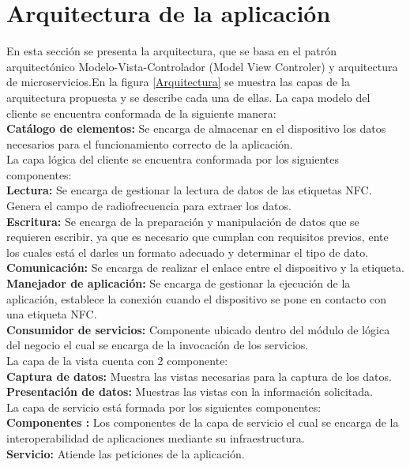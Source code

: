 \documentclass[11pt,openany]{book}
\newcounter{ns}
\begin{document}
	\section{Arquitectura de la aplicación}
	En esta sección se presenta la arquitectura, que se basa en el patrón arquitectónico Modelo-Vista-Controlador (Model View Controler) y arquitectura de microservicios.En la figura \ref{Arquitectura} se muestra las capas de la arquitectura propuesta y se describe cada una de ellas. La capa modelo del cliente se encuentra conformada de la siguiente manera:\\
	\textbf{Catálogo de elementos: }Se encarga de almacenar en el dispositivo los datos necesarios para el funcionamiento correcto de la aplicación.\\ [0.25cm]
	La capa lógica del cliente se encuentra conformada por los siguientes componentes:\\
	\textbf{Lectura: }Se encarga de gestionar la lectura de datos de las etiquetas NFC. Genera el campo de radiofrecuencia para extraer los datos.\\
	\textbf{Escritura: }Se encarga de la preparación y manipulación de datos que se requieren escribir, ya que es necesario que cumplan con requisitos previos, ente los cuales está el darles un formato adecuado y determinar el tipo de dato.\\
	\textbf{Comunicación: }Se encarga de realizar el enlace entre el dispositivo y la etiqueta.\\
	\textbf{Manejador de aplicación: }Se encarga de gestionar la ejecución de la aplicación, establece la conexión cuando el dispositivo se pone en contacto con una etiqueta NFC.\\
	\textbf{Consumidor de servicios: }Componente ubicado dentro del módulo de lógica del negocio el cual se encarga de la invocación de los servicios.\\ [0.25 cm]
	La capa de la vista cuenta con 2 componente:\\
	\textbf{Captura de datos: }Muestra las vistas necesarias para la captura de los datos.\\
	\textbf{Presentación de datos: }Muestras las vistas con la información solicitada.\\[0.25 cm]
	La capa de servicio está formada por los siguientes componentes:\\
	\textbf{Componentes : }Los componentes de la capa de servicio el cual se encarga de la interoperabilidad de aplicaciones mediante su infraestructura.\\
	\textbf{Servicio: }Atiende las peticiones de la aplicación.\\[0.25 cm]
\end{document}
